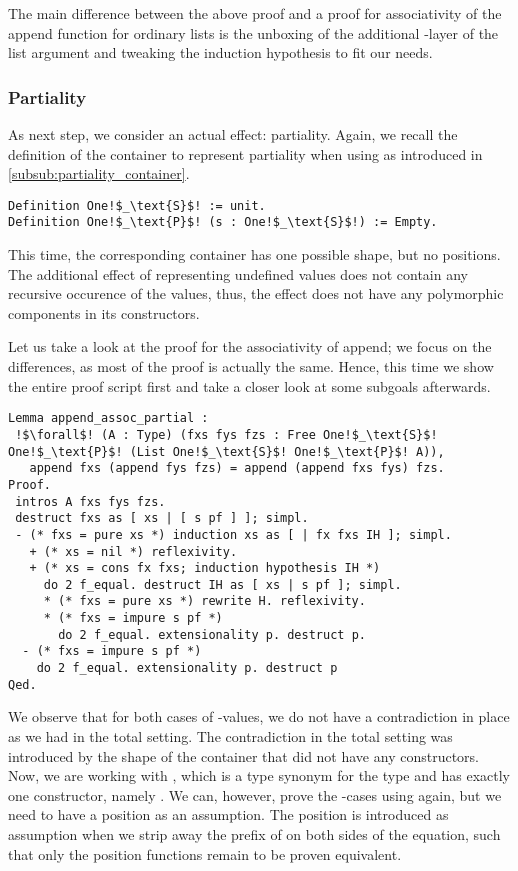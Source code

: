 The main difference between the above proof and a proof for associativity of the append function for ordinary lists is the unboxing of the additional \--layer of the list argument and tweaking the induction hypothesis to fit our needs.

\subsubsection{Partiality}
As next step, we consider an actual effect: partiality.
Again, we recall the definition of the container to represent partiality when using  as introduced in \autoref{subsub:partiality_container}.

\begin{verbatim}
Definition One!$_\text{S}$! := unit.
Definition One!$_\text{P}$! (s : One!$_\text{S}$!) := Empty.
\end{verbatim}

This time, the corresponding container has one possible shape, but no positions.
The additional effect of representing undefined values does not contain any recursive occurence of the  values, thus, the effect does not have any polymorphic components in its constructors.

Let us take a look at the proof for the associativity of append; we focus on the differences, as most of the proof is actually the same.
Hence, this time we show the entire proof script first and take a closer look at some subgoals afterwards.

\begin{verbatim}
Lemma append_assoc_partial :
 !$\forall$! (A : Type) (fxs fys fzs : Free One!$_\text{S}$! One!$_\text{P}$! (List One!$_\text{S}$! One!$_\text{P}$! A)),
   append fxs (append fys fzs) = append (append fxs fys) fzs.
Proof.
 intros A fxs fys fzs.
 destruct fxs as [ xs | [ s pf ] ]; simpl.
 - (* fxs = pure xs *) induction xs as [ | fx fxs IH ]; simpl.
   + (* xs = nil *) reflexivity.
   + (* xs = cons fx fxs; induction hypothesis IH *)
     do 2 f_equal. destruct IH as [ xs | s pf ]; simpl.
     * (* fxs = pure xs *) rewrite H. reflexivity.
     * (* fxs = impure s pf *)
       do 2 f_equal. extensionality p. destruct p.
  - (* fxs = impure s pf *)
    do 2 f_equal. extensionality p. destruct p
Qed.
\end{verbatim}

We observe that for both cases of \--values, we do not have a contradiction in place as we had in the total setting.
The contradiction in the total setting was introduced by the shape of the container that did not have any constructors.
Now, we are working with , which is a type synonym for the  type and has exactly one constructor, namely .
We can, however, prove the \--cases using  again, but we need to have a position as an assumption.
The position is introduced as assumption when we strip away the prefix of  on both sides of the equation, such that only the position functions  remain to be proven equivalent.

